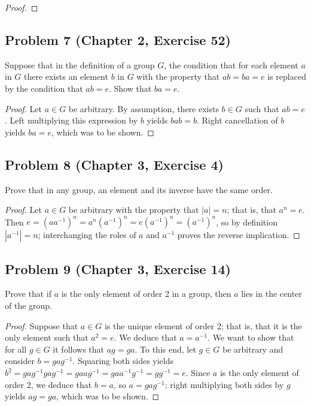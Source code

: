 \documentclass{article}
\begin{document}
\begin{proof}
\end{proof}

\subsection*{Problem 7 (Chapter 2, Exercise 52)}
Suppose that in the definition of a group $G$, the condition that for each element $a$ in $G$ there exists an element $b$ in $G$ with the property that $ab = ba = e$ is replaced by the condition that $ab = e$. Show that $ba = e$.

\begin{proof}

Let $a \in G$ be arbitrary. By assumption, there exists $b \in G$ such that $ab = e$. Left multiplying this expression by $b$ yields $bab = b$. Right cancellation of $b$ yields $ba = e$, which was to be shown.

\end{proof}

\subsection*{Problem 8 (Chapter 3, Exercise 4)}
Prove that in any group, an element and its inverse have the same order.

\begin{proof}

Let $a \in G$ be arbitrary with the property that $|a| = n$; that is, that $a^n = e$. Then $e = (aa^{-1})^n = a^n(a^{-1})^n = e(a^{-1})^n = (a^{-1})^n$, so by definition $|a^{-1}| = n$; interchanging the roles of $a$ and $a^{-1}$ proves the reverse implication.

\end{proof}

\subsection*{Problem 9 (Chapter 3, Exercise 14)}
Prove that if $a$ is the only element of order 2 in a group, then $a$ lies in the center of the group.

\begin{proof}

Suppose that $a \in G$ is the unique element of order 2; that is, that it is the only element such that $a^2 = e$. We deduce that $a = a^{-1}$. We want to show that for all $g \in G$ it follows that $ag = ga$. To this end, let $g \in G$ be arbitrary and consider $b = gag^{-1}$. Squaring both sides yields $b^2 = gag^{-1}gag^{-1} = gaag^{-1} = gaa^{-1}g^{-1} = gg^{-1} = e$. Since $a$ is the only element of order 2, we deduce that $b = a$, so $a = gag^{-1}$; right multiplying both sides by $g$ yields $ag = ga$, which was to be shown.

\end{proof}
\end{document}
